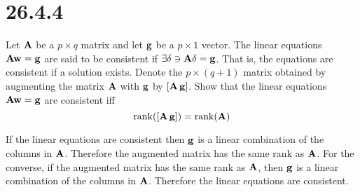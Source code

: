 \section*{26.4.4}
Let $\bf A$ be a $p\times q$ matrix and let $\bf g$ be a $p\times 1$
vector.
The linear equations ${\bf Aw}=\bf g$ are said to be consistent if
$\exists{\bf\delta}\ni{\bf A\delta}=\bf g$.
That is, the equations are consistent if a solution exists.
Denote the $p\times(q+1)$ matrix obtained by augmenting the matrix
$\bf A$ with $\bf g$ by $[{\bf A\, g}]$.
Show that the linear equations ${\bf Aw}=\bf g$ are consistent
iff
$$\mathop{\rm rank}([{\bf A\,g}])=\mathop{\rm rank}({\bf A})$$

\bigskip
\noindent
If the linear equations are consistent then $\bf g$ is
a linear combination of the columns in $\bf A$.
Therefore the augmented matrix has
the same rank as $\bf A$.
For the converse, if the augmented matrix has the same rank as
$\bf A$, then $\bf g$ is a linear combination of the columns in
$\bf A$. Therefore the linear equations are consistent.
